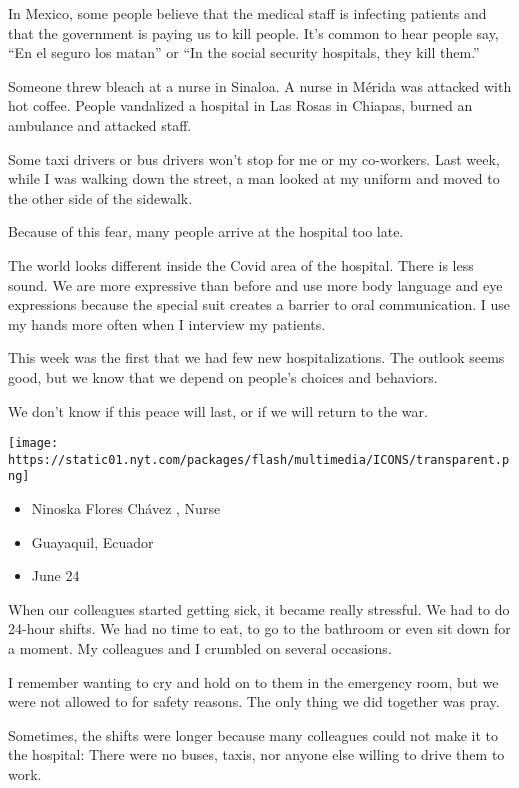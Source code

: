 In Mexico, some people believe that the medical staff is infecting
patients and that the government is paying us to kill people. It's
common to hear people say, ``En el seguro los matan'' or ``In the social
security hospitals, they kill them.''

Someone threw bleach at a nurse in Sinaloa. A nurse in Mérida was
attacked with hot coffee. People vandalized a hospital in Las Rosas in
Chiapas, burned an ambulance and attacked staff.

Some taxi drivers or bus drivers won't stop for me or my co-workers.
Last week, while I was walking down the street, a man looked at my
uniform and moved to the other side of the sidewalk.

Because of this fear, many people arrive at the hospital too late.

The world looks different inside the Covid area of the hospital. There
is less sound. We are more expressive than before and use more body
language and eye expressions because the special suit creates a barrier
to oral communication. I use my hands more often when I interview my
patients.

This week was the first that we had few new hospitalizations. The
outlook seems good, but we know that we depend on people's choices and
behaviors.

We don't know if this peace will last, or if we will return to the war.

\texttt{[image: https://static01.nyt.com/packages/flash/multimedia/ICONS/transparent.png]}

\begin{itemize}
\tightlist
\item
  Ninoska Flores Chávez , Nurse
\item
  Guayaquil, Ecuador
\item
  June 24
\end{itemize}

When our colleagues started getting sick, it became really stressful. We
had to do 24-hour shifts. We had no time to eat, to go to the bathroom
or even sit down for a moment. My colleagues and I crumbled on several
occasions.

I remember wanting to cry and hold on to them in the emergency room, but
we were not allowed to for safety reasons. The only thing we did
together was pray.

Sometimes, the shifts were longer because many colleagues could not make
it to the hospital: There were no buses, taxis, nor anyone else willing
to drive them to work.


